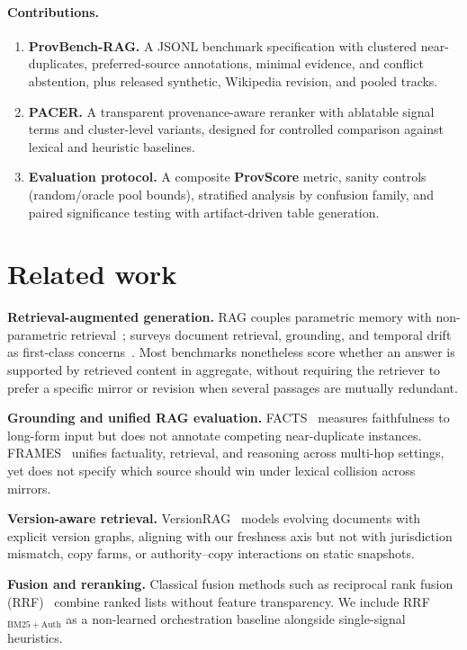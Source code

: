 \documentclass[sigconf,anonymous,review]{acmart}
\begin{document}
\paragraph{Contributions.}
\begin{enumerate}
  \item \textbf{ProvBench-RAG.} A JSONL benchmark specification with clustered near-duplicates, preferred-source annotations, minimal evidence, and conflict abstention, plus released synthetic, Wikipedia revision, and pooled tracks.
  \item \textbf{PACER.} A transparent provenance-aware reranker with ablatable signal terms and cluster-level variants, designed for controlled comparison against lexical and heuristic baselines.
  \item \textbf{Evaluation protocol.} A composite \textbf{ProvScore} metric, sanity controls (random/oracle pool bounds), stratified analysis by confusion family, and paired significance testing with artifact-driven table generation.
\end{enumerate}

\section{Related work}
\label{sec:related}

\textbf{Retrieval-augmented generation.}
RAG couples parametric memory with non-parametric retrieval~\cite{lewis2020retrieval}; surveys document retrieval, grounding, and temporal drift as first-class concerns~\cite{gao2024rag_survey}.
Most benchmarks nonetheless score whether an answer is supported by retrieved content in aggregate, without requiring the retriever to prefer a specific mirror or revision when several passages are mutually redundant.

\textbf{Grounding and unified RAG evaluation.}
FACTS~\cite{jacovi2025facts} measures faithfulness to long-form input but does not annotate competing near-duplicate instances.
FRAMES~\cite{krishna2024frames} unifies factuality, retrieval, and reasoning across multi-hop settings, yet does not specify which source should win under lexical collision across mirrors.

\textbf{Version-aware retrieval.}
VersionRAG~\cite{huwiler2025versionrag} models evolving documents with explicit version graphs, aligning with our freshness axis but not with jurisdiction mismatch, copy farms, or authority--copy interactions on static snapshots.

\textbf{Fusion and reranking.}
Classical fusion methods such as reciprocal rank fusion (RRF)~\cite{cormack2009rrf} combine ranked lists without feature transparency.
We include RRF$_{\mathrm{BM25+Auth}}$ as a non-learned orchestration baseline alongside single-signal heuristics.
\end{document}

